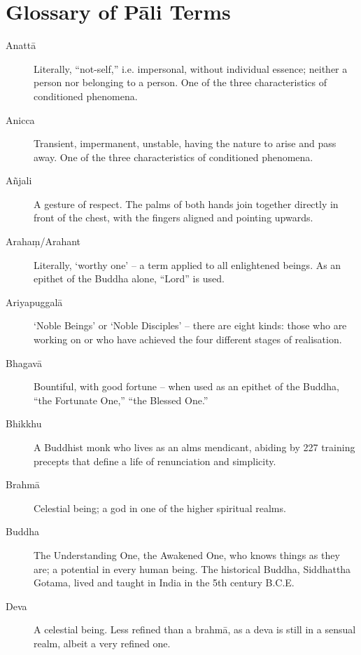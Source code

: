 \chapter{Glossary of Pāli Terms}

\begin{description}

\item[Anattā] Literally, “not-self,” i.e. impersonal, without individual
  essence; neither a person nor belonging to a person. One of the three
  characteristics of conditioned phenomena.

\item[Anicca] Transient, impermanent, unstable, having the nature to
  arise and pass away. One of the three characteristics of conditioned
  phenomena.

\item[Añjali] A gesture of respect. The palms of both hands join
  together directly in front of the chest, with the fingers aligned and
  pointing upwards.

\item[Arahaṃ/Arahant] Literally, ‘worthy one’ – a term applied to all
  enlightened beings. As an epithet of the Buddha alone, “Lord” is used.

\item[Ariyapuggalā] ‘Noble Beings’ or ‘Noble Disciples’ – there are
  eight kinds: those who are working on or who have achieved the four
  different stages of realisation.

\item[Bhagavā] Bountiful, with good fortune – when used as an epithet of
  the Buddha, “the Fortunate One,” “the Blessed One.”

\item[Bhikkhu] A Buddhist monk who lives as an alms mendicant, abiding
  by 227 training precepts that define a life of renunciation and
  simplicity.

\item[Brahmā] Celestial being; a god in one of the higher spiritual
  realms.

\item[Buddha] The Understanding One, the Awakened One, who knows things
  as they are; a potential in every human being. The historical Buddha,
  Siddhattha Gotama, lived and taught in India in the 5th century B.C.E.

\item[Deva] A celestial being. Less refined than a brahmā, as a deva is
  still in a sensual realm, albeit a very refined one.


\end{description}
